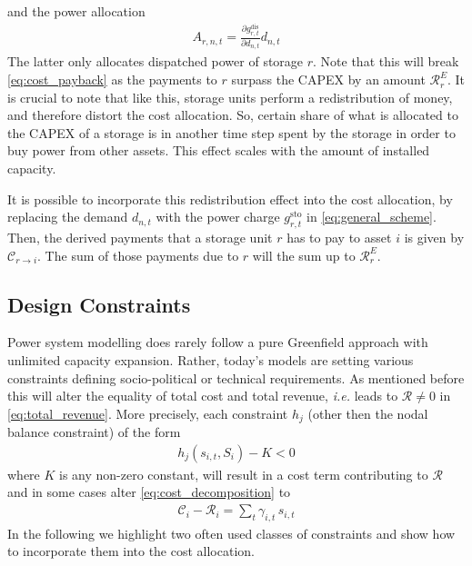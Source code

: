 \documentclass[11pt,twocolumn]{article}
\newcommand{\ie}{\textit{i.e.} }
\newcommand{\pdv}[2]{\frac{\partial #1}{\partial #2}}
\newcommand{\state}{s_{i,t}}
\newcommand{\capacity}{S_{i}}
\newcommand{\costfactor}{\gamma_{i,t}}
\newcommand{\storage}{g_{r,t}}
\newcommand{\storagedispatch}{\storage^\text{dis}}
\newcommand{\storagecharge}{\storage^\text{sto}}
\newcommand{\demand}[1][n]{d_{#1,t}}
\newcommand{\cost}{\mathcal{C}}
\newcommand{\capexstorage}{\mathcal{C}^E}
\newcommand{\remainingcost}{\mathcal{R}}
\newcommand{\allocatestoragedispatch}[1][r, n]{A_{#1,t}}
\newcommand{\allocatecapexstorage}[1][n \rightarrow r]{\capexstorage_{#1,t}}
\begin{document}
and the power allocation 
\begin{align}
    \allocatestoragedispatch = \pdv{\storagedispatch}{\demand} \demand
\end{align}
The latter only allocates dispatched power of storage $r$. Note that this will break \cref{eq:cost_payback} as the payments to $r$ surpass the CAPEX by an amount $\remainingcost^E_r$. 
It is crucial to note that like this, storage units perform a redistribution of money, and therefore distort the cost allocation. So, certain share of what is allocated to the CAPEX of a storage is in another time step spent by the storage in order to buy power from other assets. This effect scales with the amount of installed capacity.

It is possible to incorporate this redistribution effect into the cost allocation, by replacing the demand $\demand$ with the power charge $\storagecharge$ in \cref{eq:general_scheme}. Then, the derived payments that a storage unit $r$ has to pay to asset $i$ is given by $\cost_{r \rightarrow i}$. The sum of those payments due to $r$ will the sum up to $\remainingcost^E_r$. 




\subsection{Design Constraints}

Power system modelling does rarely follow a pure Greenfield approach with unlimited capacity expansion. Rather, today's models are setting various constraints defining socio-political or  technical requirements. As mentioned before this will alter the equality of total cost and total revenue, \ie leads to $\remainingcost \ne 0$ in \cref{eq:total_revenue}. More precisely, each constraint $h_j$ (other then the nodal balance constraint) of the form 
\begin{align}
    h_j \left(\state, \capacity \right) - K < 0
\end{align}
where $K$ is any non-zero constant, will result in a cost term contributing to $\remainingcost$ and in some cases alter \cref{eq:cost_decomposition} to 
\begin{align}
    \cost_i - \remainingcost_i = \sum_t \costfactor \, \state
\end{align}
In the following we highlight two often used classes of constraints and show how to incorporate them into the cost allocation.  
\end{document}
